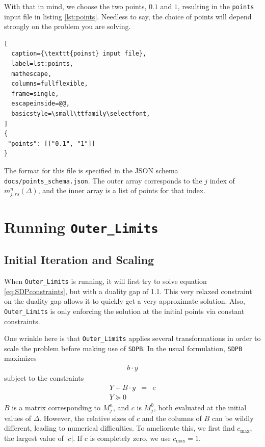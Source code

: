 \documentclass[12pt]{article}
\numberwithin{equation}{section}
\begin{document}
With that in mind, we choose the two points, $0.1$ and $1$,
resulting in the \texttt{points} input file in listing \ref{lst:points}.
Needless to say, the choice of points will depend strongly on the
problem you are solving.

\begin{lstlisting}[
  caption={\texttt{poinst} input file},
  label=lst:points,
  mathescape,
  columns=fullflexible,
  frame=single,
  escapeinside=@@,
  basicstyle=\small\ttfamily\selectfont,
]
{
 "points": [["0.1", "1"]]
}
\end{lstlisting}

The format for this file is specified in the JSON schema
\texttt{docs/points\_schema.json}.  The outer array corresponds to the
$j$ index of $m_{j,rs}^{n}(\Delta)$, and the inner array is a list
of points for that index.

\section{Running \texttt{Outer\_Limits}}
\label{sec:running}

\subsection{Initial Iteration and Scaling}
\label{subsec:initial}

When \texttt{Outer\_Limits} is running, it will first try to solve
equation \ref{eq:SDPconstraints}, but with a duality gap of 1.1.  This
very relaxed constraint on the duality gap allows it to quickly get a
very approximate solution.  Also, \texttt{Outer\_Limits} is only
enforcing the solution at the initial points via constant constraints.

One wrinkle here is that \texttt{Outer\_Limits} applies several
transformations in order to scale the problem before making use of
\texttt{SDPB}.  In the usual formulation, \texttt{SDPB} maximizes
\begin{eqnarray}
  b\cdot y
\end{eqnarray}
subject to the constraints
\begin{eqnarray}
  Y + B\cdot y & = & c\\
  Y \succeq 0
\end{eqnarray}
$B$ is a matrix corresponding to $M^n_j$, and $c$ is $M^0_j$, both evaluated
at the initial values of $\Delta$.  However, the relative sizes
of $c$ and the columns of $B$ can be wildly different, leading to
numerical difficulties.  To ameliorate this, we first find $c_{\max}$,
the largest value of $|c|$.  If $c$ is completely zero, we use
$c_{\max}=1$.
\end{document}
